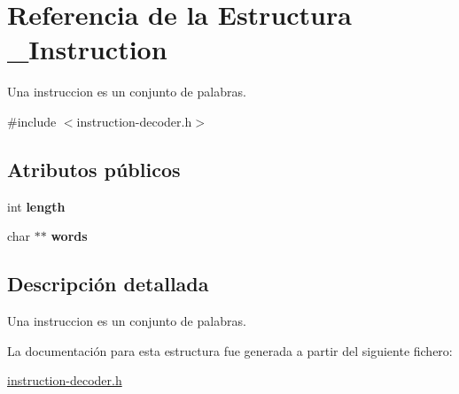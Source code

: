 \hypertarget{struct__Instruction}{}\section{Referencia de la Estructura \+\_\+\+Instruction}
\label{struct__Instruction}


Una instruccion es un conjunto de palabras.  




{\ttfamily \#include $<$instruction-\/decoder.\+h$>$}

\subsection*{Atributos públicos}
\begin{DoxyCompactItemize}
\item 
int {\bfseries length}\hypertarget{struct__Instruction_a739a0f6a39a0b3281b98d701bc23bef7}{}\label{struct__Instruction_a739a0f6a39a0b3281b98d701bc23bef7}

\item 
char $\ast$$\ast$ {\bfseries words}\hypertarget{struct__Instruction_a27efbe539aac68a6d39078d8630eff05}{}\label{struct__Instruction_a27efbe539aac68a6d39078d8630eff05}

\end{DoxyCompactItemize}


\subsection{Descripción detallada}
Una instruccion es un conjunto de palabras. 

La documentación para esta estructura fue generada a partir del siguiente fichero\+:\begin{DoxyCompactItemize}
\item 
\hyperlink{instruction-decoder_8h}{instruction-\/decoder.\+h}\end{DoxyCompactItemize}
